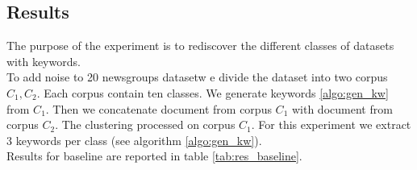 \subsection{Results}
The purpose of the experiment is to rediscover the different classes of 
datasets with keywords.\\
To add noise to 20 newsgroups datasetw e divide the dataset into two corpus $C_1, C_2$. 
Each corpus contain ten classes. We generate keywords \ref{algo:gen_kw} 
from $C_1$. Then we concatenate document from corpus $C_1$ with document
from corpus $C_2$. The clustering processed on corpus $C_1$. For this experiment
we extract 3 keywords per class (see algorithm \ref{algo:gen_kw}).
\\Results for baseline are reported in table \ref{tab:res_baseline}.

\begin{table}
\caption{\label{tab:res_mask}Clustering applies to 
different learned latent space to measure the efficiency of lexical constraints
for $K$-Means algorithm. Performance is measured in terms of NMI, Adjusted Rand 
Index and clustering Accuracy, higher is better. Each cell contains the average
and the standard deviation computed over 10 runs.}
\centering
{}
\resizebox{\hsize}{!}{
}
\end{table}
